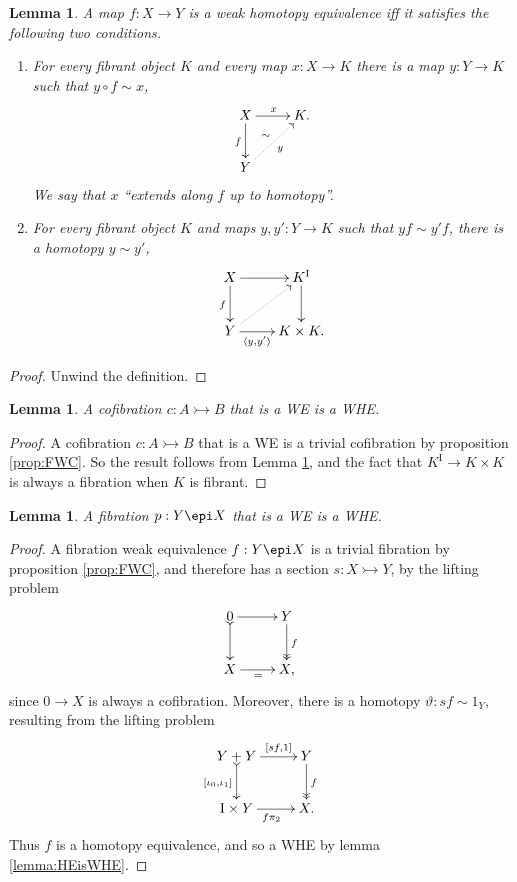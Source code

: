 \documentclass[12pt]{article}
\newcommand{\mono}{\ensuremath{\rightarrowtail}}
\newcommand{\ra}{\ensuremath{\rightarrow}}
\newcommand{\I}{\ensuremath{\mathrm{I}}}
\newtheorem{lemma}[theorem]{Lemma}
\theoremstyle{remark}
\theoremstyle{definition}
\begin{document}
\begin{lemma}\label{lem:WHEunwound}
A map $f : X\ra Y$ is a \emph{weak homotopy equivalence} iff it satisfies the following two conditions.
\begin{enumerate}
\item For every fibrant object $K$ and every map $x : X \ra K$ there is a map $y:Y\ra K$ such that $y\circ f \sim x$,
\[
\xymatrix{
X \ar[d]_{f} \ar[r]^{x}  & K.\\
Y \ar@{..>}[ru]_{y}^{\sim} &
}
\]
We say that $x$ ``extends along $f$ up to homotopy''.
\item For every fibrant object $K$ and maps $y, y' : Y \ra K$ such that $yf \sim y'f$, there is a homotopy $y\sim y'$,
\[
\xymatrix{
X \ar[d]_{f} \ar[r]  & K^\I\ar[d] \\
Y \ar@{..>}[ru] \ar[r]_-{\langle y,y'\rangle} & K\times K.
}
\]
\end{enumerate}
\end{lemma}
\begin{proof}
Unwind the definition.
\end{proof}

\begin{lemma}\label{lemma:CofWEtoWHE}
A cofibration $c : A \mono B$ that is a WE is a WHE.
\end{lemma}

\begin{proof}
A cofibration $c : A \mono B$ that is a WE is a trivial cofibration by proposition \ref{prop:FWC}. 
So the result follows from Lemma \ref{lem:WHEunwound}, and the fact that $K^\I\ra K\times K$ is always a fibration when $K$ is fibrant.
\end{proof}

\begin{lemma}\label{lemma:FibWEtoWHE}
A fibration $ p : Y \epi X$ that is a WE is a WHE.
\end{lemma}
\begin{proof}
A fibration weak equivalence $f : Y\epi X$ is a trivial fibration by proposition \ref{prop:FWC}, and therefore has a section $s: X\mono Y$, by the lifting problem
\begin{equation*}%
\xymatrix{
0 \ar@{>->}[d]_{} \ar[r] & Y \ar@{>>}[d]^{f} \\
X\ar[r]_{=} & X,
}
\end{equation*}
%
since $0\ra X$ is always a cofibration. Moreover, there is a homotopy $\vartheta : sf \sim 1_Y$, resulting from the lifting problem
\begin{equation*}%
\xymatrix{
Y+Y \ar@{>->}[d]_{[\iota_0, \iota_1]} \ar[r]^-{[sf, 1]}  & Y\ar@{>>}[d]^{f} \\
\I\times Y \ar[r]_{f\pi_2} & X.
}
\end{equation*}
Thus $f$ is a homotopy equivalence, and so a WHE by lemma \ref{lemma:HEisWHE}.
\end{proof}
\end{document}
